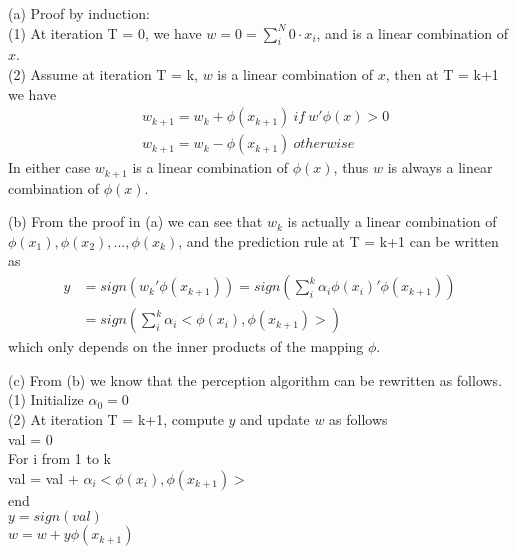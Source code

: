 \documentclass[12pt]{article}
\newenvironment{problem}[2][Problem]{\begin{trivlist}
\item[\hskip \labelsep {\bfseries #1}\hskip \labelsep {\bfseries #2}]}{\end{trivlist}}
\begin{document}
\begin{problem}{2. Kernalized Perception}
\item{(a)} Proof by induction:\\
(1) At iteration T = 0, we have $w = 0 = \sum_i^N 0\cdot x_i$, and is a linear combination of $x$.\\
(2) Assume at iteration T = k, $w$ is a linear combination of $x$, then at T = k+1 we have 
\begin{align*}
&w_{k+1} = w_k + \phi(x_{k+1}) \ if \ w'\phi(x) > 0\\
&w_{k+1} = w_k - \phi(x_{k+1}) \ otherwise
\end{align*}
In either case $w_{k+1}$ is a linear combination of $\phi(x)$, thus $w$ is always a linear combination of $\phi(x)$.
\\
\item{(b)} From the proof in (a) we can see that $w_k$ is actually a linear combination of $\phi(x_1), \phi(x_2), ..., \phi(x_k)$, and the prediction rule at T = k+1 can be written as
\begin{align*}
	y &= sign(w_k'\phi(x_{k+1})) = sign(\sum_i^{k} \alpha_i\phi(x_i)'\phi(x_{k+1})) \\
	  &= sign(\sum_i^{k} \alpha_i<\phi(x_i), \phi(x_{k+1})>)
\end{align*}
which only depends on the inner products of the mapping $\phi$.
\\
\item{(c)}
From (b) we know that the perception algorithm can be rewritten as follows.\\
(1) Initialize $\alpha_0 = 0$\\
(2) At iteration T = k+1, compute $y$ and update $w$ as follows\\
\indent val = 0\\
\indent For i from 1 to k\\
\indent \indent val = val + $\alpha_i <\phi(x_i), \phi(x_{k+1})>$\\
\indent end\\
\indent $y = sign(val)$\\
\indent $w = w + y\phi(x_{k+1})$\\
\end{problem}
\end{document}
